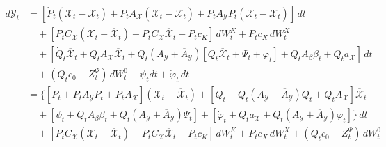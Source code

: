 \documentclass[10pt,a4paper]{amsart}
\numberwithin{equation}{section}
\begin{document}
\begin{align}\label{eq:iniz_coef_dY}
    d{\mathcal{Y}}_t & = \left[ \dot{P}_t ({\mathcal{X}}_t - \overline{{\mathcal{X}}}_t) + {P}_t A_{\mathcal{X}} ({\mathcal{X}}_t - \overline{{\mathcal{X}}}_t) + {P}_t A_{\mathcal{Y}} {P}_t({\mathcal{X}}_t - \overline{{\mathcal{X}}}_t)\right]\,dt \\
    \nonumber
    & \quad + \left[{P}_t C_{\mathcal{X}}({\mathcal{X}}_t - \overline{{\mathcal{X}}}_t) + {P}_t C_{\mathcal{X}} \overline{{\mathcal{X}}}_t +P_tc_K\right]\,dW_t^{K} +P_tc_X\,dW_t^{X} \\
    \nonumber
    &\quad +\left[ \dot{Q}_t\overline{{\mathcal{X}}}_t + Q_t A_{\mathcal{X}} \overline{{\mathcal{X}}}_t + Q_t (A_{\mathcal{Y}} + \overline{A}_{\mathcal{Y}})\left[Q_t \overline{{\mathcal{X}}}_t + \Psi_t + \varphi_t\right]+ Q_t A_\beta \beta_t + Q_t a_\mathcal{X}\right]\,dt \\
    \nonumber
    &\quad + (Q_t c_{0}-Z^\Psi_t)\,dW_t^{0} +\psi_t dt+ \dot{\varphi}_t\,dt\\
    \nonumber
    & = \Big\{ \left[\dot{{P}}_t +{P}_t A_{\mathcal{Y}} {P}_t + {P}_t A_{\mathcal{X}}\right]({\mathcal{X}}_t - \overline{{\mathcal{X}}}_t) + \left[ \dot{Q}_t + Q_t (A_{\mathcal{Y}}+ \overline{A}_{\mathcal{Y}}) Q_t + Q_t A_{\mathcal{X}} \right] \overline{{\mathcal{X}}}_t \\ 
    \nonumber
    &\quad  +\left[ \psi_t + Q_t A_\beta \beta_t + Q_t (A_{\mathcal{Y}}+ \overline{A}_{\mathcal{Y}})\Psi_t \right] + \left[\dot{\varphi}_t +Q_t a_\mathcal{X} + Q_t (A_{\mathcal{Y}}+ \overline{A}_{\mathcal{Y}})\varphi_t\right] \Big\}\,dt\\  
    \nonumber
    & \quad + \left[{P}_t C_{\mathcal{X}}({\mathcal{X}}_t - \overline{{\mathcal{X}}}_t) + {P}_t C_{\mathcal{X}} \overline{{\mathcal{X}}}_t +P_tc_K\right]\,dW_t^{K} +P_tc_X\,dW_t^{X} + (Q_t c_{0}-Z^\Psi_t)\,dW_t^{0}
\end{align}
\end{document}
